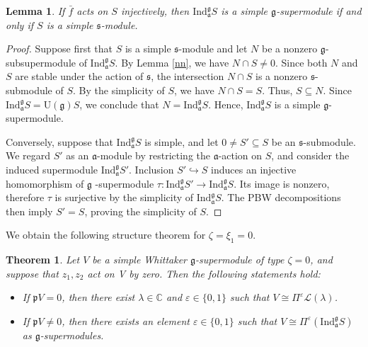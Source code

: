 \documentclass[a4paper,10pt]{article}
\theoremstyle{definition}
\theoremstyle{plain}
\newtheorem{theorem}[definition]{Theorem}
\newtheorem{lemma}[definition]{Lemma}
\theoremstyle{remark}
\theoremstyle{mystyle}
\numberwithin{equation}{section}
\begin{document}
\begin{lemma}\label{simeq}
    If $\bar f$ acts on \(S\) injectively, then $\mathrm{Ind}_{\mathfrak a}^{\mathfrak g}S$ is a simple $\mathfrak g$-supermodule if and only if $S$ is a simple $\mathfrak s$-module.
\end{lemma}
\begin{proof}
    Suppose first that $S$ is a simple $\mathfrak s$-module and let $N$ be a nonzero $\mathfrak g$-subsupermodule of $\mathrm{Ind}_{\mathfrak a}^{\mathfrak g}S$.
    By Lemma \ref{nn}, we have $N\cap S\neq0.$
    Since both $N$ and $S$ are stable under the action of $\mathfrak s$, the intersection $N\cap S$ is a nonzero $\mathfrak s$-submodule of $S$. By the simplicity of $S$, we have $N\cap S=S.$
    Thus, $S\subseteq N$. Since $\mathrm{Ind}_{\mathfrak a}^{\mathfrak g}S=\mathrm U(\mathfrak g)S$, we conclude that $N=\mathrm{Ind}_{\mathfrak a}^{\mathfrak g}S$. Hence, $\mathrm{Ind}_{\mathfrak a}^{\mathfrak g}S$ is a simple $\mathfrak g$-supermodule.

    Conversely, suppose that $\mathrm{Ind}_{\mathfrak a}^{\mathfrak g}S$ is simple, and let $0\neq S'\subseteq S$ be an $\mathfrak s$-submodule. We regard $S'$ as an $\mathfrak a$-module by restricting the $\mathfrak a$-action on $S$, and consider the induced supermodule $\mathrm{Ind}_{\mathfrak a}^{\mathfrak g}S'$.
    Inclusion $S'\hookrightarrow S$ induces an injective homomorphism of $\mathfrak g$ -supermodule $\tau :\mathrm{Ind}_{\mathfrak a}^{\mathfrak g}S'\to \mathrm{Ind}_{\mathfrak a}^{\mathfrak g}S.$
    Its image is nonzero, therefore $\tau $ is surjective by the simplicity of \(\mathrm{Ind}_{\mathfrak a}^{\mathfrak g}S\). The PBW decompositions then imply \(S'=S\), proving the simplicity of $S$.
\end{proof}
We obtain the following structure theorem for \(\zeta=\xi_1=0\).
\begin{theorem}\label{cc}
    Let $V$ be a simple Whittaker $\mathfrak g$-supermodule of type $\zeta=0$, and suppose that $z_1,z_2$ act on V by zero. Then the following statements hold:
    \begin{itemize}
        \item[(1).] If $\mathfrak pV=0$, then there exist $\lambda\in \mathbb C$ and $\varepsilon\in \{0,1\}$ such that $V\cong \Pi^{\varepsilon}\mathcal L(\lambda)$.
        \item[(2).] If $\mathfrak pV\neq 0$, then there exists an element $\varepsilon\in \{0,1\}$ such that $V\cong \Pi^{\varepsilon}(\mathrm{Ind}_{\mathfrak a}^{\mathfrak g}S)$ as $\mathfrak g$-supermodules.
    \end{itemize}
\end{theorem}
\end{document}
